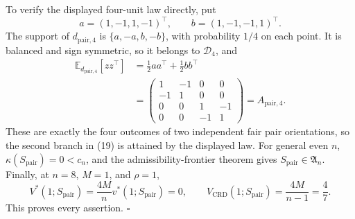 To verify the displayed four-unit law directly, put
\[
a=(1,-1,1,-1)^\top,
\qquad
b=(1,-1,-1,1)^\top.
\]
The support of \(d_{\mathrm{pair},4}\) is \(\{a,-a,b,-b\}\), with probability \(1/4\) on each point. It is balanced and sign symmetric, so it belongs to \(\mathcal D_4\), and
\[
\begin{aligned}
\mathbb E_{d_{\mathrm{pair},4}}[zz^\top]
&=\frac12aa^\top+\frac12bb^\top\\
&=\begin{pmatrix}
1&-1&0&0\\
-1&1&0&0\\
0&0&1&-1\\
0&0&-1&1
\end{pmatrix}
=A_{\mathrm{pair},4}.
\end{aligned}
\tag{20}
\]
These are exactly the four outcomes of two independent fair pair orientations, so the second branch in (19) is attained by the displayed law. For general even \(n\), \(\kappa(S_{\mathrm{pair}})=0<c_n\), and the admissibility-frontier theorem gives \(S_{\mathrm{pair}}\in\mathfrak A_n\). Finally, at \(n=8\), \(M=1\), and \(\rho=1\),
\[
V^*(1;S_{\mathrm{pair}})
=\frac{4M}{n}v^*(1;S_{\mathrm{pair}})=0,
\qquad
V_{\mathrm{CRD}}(1;S_{\mathrm{pair}})=\frac{4M}{n-1}=\frac47.
\tag{21}
\]
This proves every assertion. \(\square\)